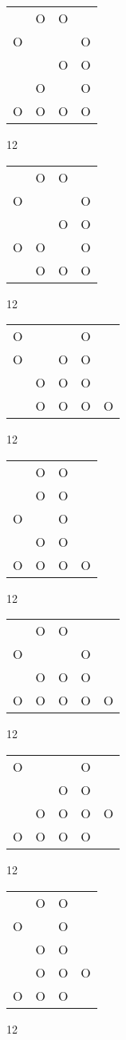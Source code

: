 \begin{tabular}{|m{0.2cm}m{0.2cm}m{0.2cm}m{0.2cm}|}\hline
 &O&O& \\
O& & &O\\
 & &O&O\\
 &O& &O\\
O&O&O&O\\
\hline\end{tabular}12
\begin{tabular}{|m{0.2cm}m{0.2cm}m{0.2cm}m{0.2cm}|}\hline
 &O&O& \\
O& & &O\\
 & &O&O\\
O&O& &O\\
 &O&O&O\\
\hline\end{tabular}12
\begin{tabular}{|m{0.2cm}m{0.2cm}m{0.2cm}m{0.2cm}m{0.2cm}|}\hline
O& & &O& \\
O& &O&O& \\
 &O&O&O& \\
 &O&O&O&O\\
\hline\end{tabular}12
\begin{tabular}{|m{0.2cm}m{0.2cm}m{0.2cm}m{0.2cm}|}\hline
 &O&O& \\
 &O&O& \\
O& &O& \\
 &O&O& \\
O&O&O&O\\
\hline\end{tabular}12
\begin{tabular}{|m{0.2cm}m{0.2cm}m{0.2cm}m{0.2cm}m{0.2cm}|}\hline
 &O&O& & \\
O& & &O& \\
 &O&O&O& \\
O&O&O&O&O\\
\hline\end{tabular}12
\begin{tabular}{|m{0.2cm}m{0.2cm}m{0.2cm}m{0.2cm}m{0.2cm}|}\hline
O& & &O& \\
 & &O&O& \\
 &O&O&O&O\\
O&O&O&O& \\
\hline\end{tabular}12
\begin{tabular}{|m{0.2cm}m{0.2cm}m{0.2cm}m{0.2cm}|}\hline
 &O&O& \\
O& &O& \\
 &O&O& \\
 &O&O&O\\
O&O&O& \\
\hline\end{tabular}12
